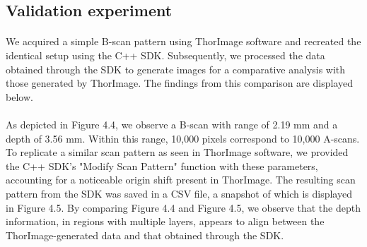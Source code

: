 



\subsection{Validation experiment}
\paragraph{}
We acquired a simple B-scan pattern using ThorImage software and recreated the identical setup using the C++ SDK. Subsequently, we processed the data obtained through the SDK to generate images for a comparative analysis with those generated by ThorImage. The findings from this comparison are displayed below.

\paragraph{}
As depicted in Figure 4.4, we observe a B-scan with range of 2.19 mm and a depth of 3.56 mm. Within this range, 10,000 pixels correspond to 10,000 A-scans. To replicate a similar scan pattern as seen in ThorImage software, we provided the C++ SDK's "Modify Scan Pattern" function with these parameters, accounting for a noticeable origin shift present in ThorImage. The resulting scan pattern from the SDK was saved in a CSV file, a snapshot of which is displayed in Figure 4.5. By comparing Figure 4.4 and Figure 4.5, we observe that the depth information, in regions with multiple layers, appears to align between the ThorImage-generated data and that obtained through the SDK.

